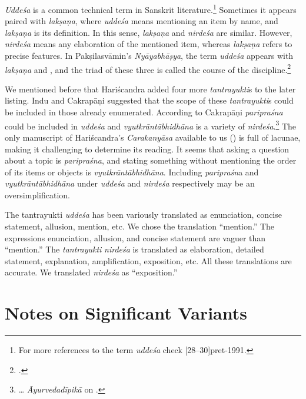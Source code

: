 \emph{Uddeśa} is a common technical term in Sanskrit literature.\footnote{%
	For more references to the term \emph{uddeśa} check 
[28--30]{pret-1991}.} 
Sometimes it appears paired with \emph{lakṣaṇa}, 
where \emph{uddeśa} means mentioning an item by name,
and \emph{lakṣaṇa} is its definition. 
In this sense, \emph{lakṣaṇa} and \emph{nirdeśa} are similar. 
However, \emph{nirdeśa} means any elaboration of the mentioned item, 
whereas \emph{lakṣaṇa} refers to precise features. 
In Pakṣilasvāmin's \emph{Nyāyabhāṣya}, the term \emph{uddeśa} appears with 
\emph{lakṣaṇa} and , 
and the triad of these three is called the course of the discipline.\footnote{%
		\cite[14]{josh-1922}.}
	
We mentioned before that Hariścandra added four more \emph{tantrayukti}s to 
the later listing. 
Indu and Cakrapāṇi suggested that 
the scope of these \emph{tantrayukti}s could be included in those already 
enumerated. 
According to Cakrapāṇi \emph{paripraśna} could be included in \emph{uddeśa} 
and \emph{vyutkrāntābhidhāna} is a variety of \emph{nirdeśa}.\footnote{%
	\ldots
	\emph{Āyurvedadīpikā} on .} 
The only manuscript of Hariścandra's \emph{Carakanyāsa} available to us 
() 
is full of lacunae, making it challenging to determine its reading. 
It seems that asking a question about a topic is \emph{paripraśna}, 
and stating something without mentioning the order of its items or objects is 
\emph{vyutkrāntābhidhāna}. 
Including \emph{paripraśn}a and \emph{vyutkrāntābhidhāna} under 
\emph{uddeśa} and \emph{nirdeśa} respectively may be an oversimplification.

The tantrayukti \emph{uddeśa} has been variously translated as 
enunciation, concise statement, allusion, mention, etc. 
We chose the translation “mention.” 
The expressions enunciation, allusion, and concise statement are vaguer than 
“mention.” 
The \emph{tantrayukti} \emph{nirdeśa} is translated as 
elaboration, detailed statement, explanation, amplification, exposition, etc. 
All these translations are accurate. 
We translated \emph{nirdeśa} as “exposition.”

\section{Notes on Significant Variants}

